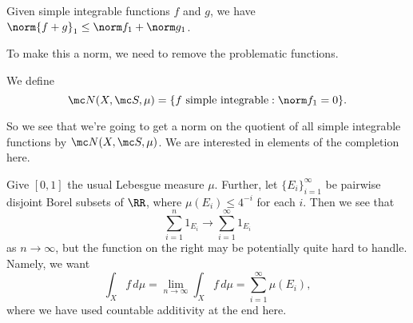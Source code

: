 \documentclass[../notes.tex]{subfiles}
\begin{document}
\begin{lemma}
	Given simple integrable functions $f$ and $g$, we have $\norm{f+g}_1\le\norm f_1+\norm g_1$.
\end{lemma}
To make this a norm, we need to remove the problematic functions.
\begin{notation}
	We define
	\[\mc N(X,\mc S,\mu)=\{f\text{ simple integrable}:\norm f_1=0\}.\]
\end{notation}
So we see that we're going to get a norm on the quotient of all simple integrable functions by $\mc N(X,\mc S,\mu)$. We are interested in elements of the completion here.
\begin{example}
	Give $[0,1]$ the usual Lebesgue measure $\mu$. Further, let $\{E_i\}_{i=1}^\infty$ be pairwise disjoint Borel subsets of $\RR$, where $\mu(E_i)\le 4^{-i}$ for each $i$. Then we see that
	\[\sum_{i=1}^n1_{E_i}\to\sum_{i=1}^\infty1_{E_i}\]
	as $n\to\infty$, but the function on the right may be potentially quite hard to handle. Namely, we want
	\[\int_Xf\,d\mu=\lim_{n\to\infty}\int_Xf\,d\mu=\sum_{i=1}^\infty\mu(E_i),\]
	where we have used countable additivity at the end here.
\end{example}
\end{document}

